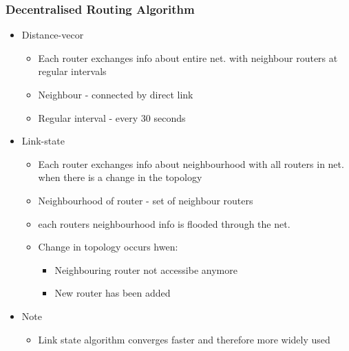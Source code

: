 \subsubsection{Decentralised Routing Algorithm}
	\begin{itemize}
		\item Distance-vecor
		\begin{itemize}
			\item Each router exchanges info about entire net. with
				neighbour routers at regular intervals
			\item Neighbour - connected by direct link
			\item Regular interval - every 30 seconds
		\end{itemize}
		\item Link-state
		\begin{itemize}
			\item Each router exchanges info about neighbourhood
				with all routers in net. when there is a change
				in the topology
			\item Neighbourhood of router - set of neighbour routers
			\item each routers neighbourhood info is flooded through
				the net.
			\item Change in topology occurs hwen:
			\begin{itemize}
				\item Neighbouring router not accessibe anymore
				\item New router has been added
			\end{itemize}
		\end{itemize}
		\item Note
		\begin{itemize}
			\item Link state algorithm converges faster and
				therefore more widely used
		\end{itemize}
	\end{itemize}
